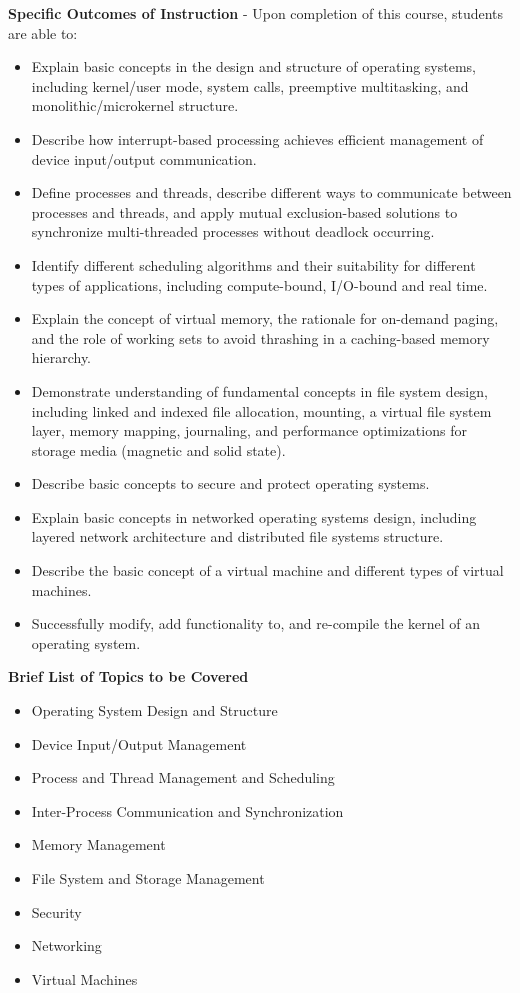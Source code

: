 {    \noindent \textbf{Specific Outcomes of Instruction} - Upon completion of this course, students are able to: \\
    \begin{itemize}
        \item Explain basic concepts in the design and structure of operating systems, including kernel/user mode, system calls, preemptive multitasking, and monolithic/microkernel structure.
        \item Describe how interrupt-based processing achieves efficient management of device input/output communication.
        \item Define processes and threads, describe different ways to communicate between processes and threads, and apply mutual exclusion-based solutions to synchronize multi-threaded processes without deadlock occurring.
        \item Identify different scheduling algorithms and their suitability for different types of applications, including compute-bound, I/O-bound and real time.
        \item Explain the concept of virtual memory, the rationale for on-demand paging, and the role of working sets to avoid thrashing in a caching-based memory hierarchy.
        \item Demonstrate understanding of fundamental concepts in file system design, including linked and indexed file allocation, mounting, a virtual file system layer, memory mapping, journaling, and performance optimizations for storage media (magnetic and solid state).
        \item Describe basic concepts to secure and protect operating systems.
        \item Explain basic concepts in networked operating systems design, including layered network architecture and distributed file systems structure.
        \item Describe the basic concept of a virtual machine and different types of virtual machines.
        \item Successfully modify, add functionality to, and re-compile the kernel of an operating system.
    \end{itemize}
    
    \noindent \textbf{Brief List of Topics to be Covered}
    \begin{itemize}
        \item Operating System Design and Structure
        \item Device Input/Output Management
        \item Process and Thread Management and Scheduling
        \item Inter-Process Communication and Synchronization
        \item Memory Management
        \item File System and Storage Management
        \item Security
        \item Networking
        \item Virtual Machines
    \end{itemize}
    
}
